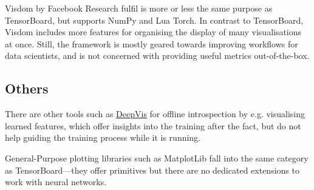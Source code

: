Visdom by Facebook Research fulfil is more or less the same purpose as
TensorBoard, but supports NumPy and Lua Torch. In contrast to
TensorBoard, Visdom includes more features for organising the display of
many visualisations at once. Still, the framework is mostly geared
towards improving workflows for data scientists, and is not concerned
with providing useful metrics out-of-the-box.

\hypertarget{others}{%
\subsection*{Others}\label{others}}

There are other tools such as \href{http://yosinski.com/deepvis}{DeepVis} for
offline introspection by e.g.  visualising learned features, which offer
insights into the training after the fact, but do not help guiding the training
process while it is running.

General-Purpose plotting libraries such as MatplotLib fall into the same
category as TensorBoard---they offer primitives but there are no dedicated
extensions to work with neural networks.
